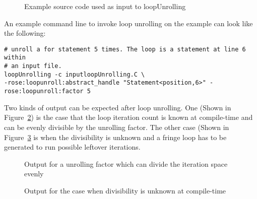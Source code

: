\begin{figure}[!h]
{\indent
  {\mySmallFontSize
      \begin{latexonly}
    
    \end{latexonly}
      \begin{htmlonly}
    
    \end{htmlonly}
  }
}
\caption{Example source code used as input to loopUnrolling }
    \label{Tutorial:exampleInputCode_LoopUnrollingp}
\end{figure}

An example command line to invoke loop unrolling on the example can look
like the following:
\begin{verbatim}
# unroll a for statement 5 times. The loop is a statement at line 6 within
# an input file.
loopUnrolling -c inputloopUnrolling.C \
-rose:loopunroll:abstract_handle "Statement<position,6>" -rose:loopunroll:factor 5
\end{verbatim}

Two kinds of output can be expected after loop unrolling.
One (Shown in Figure~\ref{Tutorial:exampleOutput_LoopUnrollingpEven}) is the case that the loop iteration count is known at compile-time and
can be evenly divisible by the unrolling factor.
The other case (Shown in
Figure~\ref{Tutorial:exampleOutput_LoopUnrollingpNonEven} is when the divisibility is unknown and a fringe loop has to
be generated to run possible leftover iterations.
\begin{figure}[!h]
{\indent
  {\mySmallFontSize
      \begin{latexonly}
    
    \end{latexonly}
      \begin{htmlonly}
    
    \end{htmlonly}
  }
}
\caption{Output for a unrolling factor which can divide the iteration space evenly}
    \label{Tutorial:exampleOutput_LoopUnrollingpEven}
\end{figure}
\begin{figure}[!h]
{\indent
  {\mySmallFontSize
      \begin{latexonly}
    
    \end{latexonly}
      \begin{htmlonly}
    
    \end{htmlonly}
  }
}
\caption{Output for the case when divisibility is unknown at compile-time}
    \label{Tutorial:exampleOutput_LoopUnrollingpNonEven}
\end{figure}

